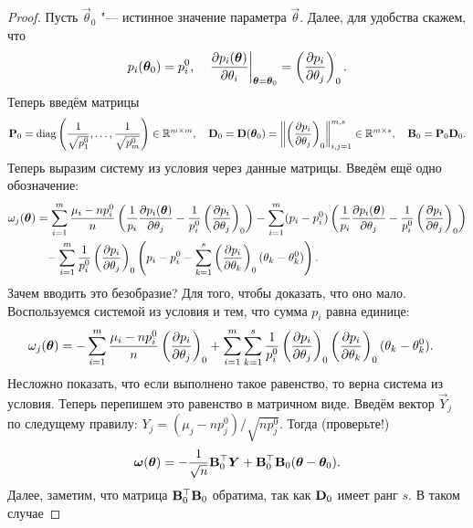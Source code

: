 \begin{proof}
	Пусть $\vec{\theta}_{0}$ "--- истинное значение параметра $\vec{\theta}$. Далее, для удобства скажем, что
	\[
		p_{i}(\bm{\theta}_{0}) = p_{i}^{0}, 
		\quad
		\left.\pdv{p_{i}(\bm{\theta})}{\theta_{i}}\right|_{\bm{\theta} = \bm{\theta}_{0}}
		= \left(\pdv{p_{i}}{\theta_{j}}\right)_{0}.
	\]
	Теперь введём матрицы
	\[
		\mathbf{P}_{0}
		= \operatorname{diag}\left(\frac{1}{\sqrt{p_{1}^{0}}}, \ldots, \frac{1}{\sqrt{p_{m}^{0}}}\right) \in \mathbb{R}^{m \times m},
		\quad
		\mathbf{D}_{0}
		= \mathbf{D}(\bm{\theta}_{0})
		= \left\|\left(\pdv{p_{i}}{\theta_{j}}\right)_{0}\right\|_{i, j = 1}^{m, s} \in \mathbb{R}^{m \times s},
		\quad 
		\mathbf{B}_{0}
		= \mathbf{P}_{0}\mathbf{D}_{0}.
	\]
	Теперь выразим систему из условия через данные матрицы. Введём ещё одно обозначение:
	\begin{align*}
		\omega_{j}(\bm{\theta})
		&= \sum_{i = 1}^{m} \frac{\mu_{i} - np_{i}^{0}}{n}\left(\frac{1}{p_{i}}\pdv{p_{i}(\bm{\theta})}{\theta_{j}} - \frac{1}{p_{i}^{0}}\left(\pdv{p_{i}}{\theta_{j}}\right)_{0}\right)
		- \sum_{i = 1}^{m} (p_{i} - p_{i}^{0})\left(\frac{1}{p_{i}}\pdv{p_{i}(\bm{\theta})}{\theta_{j}} - \frac{1}{p_{i}^{0}}\left(\pdv{p_{i}}{\theta_{j}}\right)_{0}\right) \\
		&\hphantom{=}- \sum_{i = 1}^{m} \frac{1}{p_{i}^{0}}\left(\pdv{p_{i}}{\theta_{j}}\right)_{0}\left(p_{i} - p_{i}^{0} - \sum_{k = 1}^{s}\left(\pdv{p_{i}}{\theta_{k}}\right)_{0}(\theta_{k} - \theta_{k}^{0})\right).
	\end{align*}
	Зачем вводить это безобразие? Для того, чтобы доказать, что оно мало. Воспользуемся системой из условия и тем, что сумма $p_{i}$ равна единице:
	\begin{align*}
		\omega_{j}(\bm{\theta})
		&= -\sum_{i = 1}^{m} \frac{\mu_{i} - np_{i}^{0}}{n}\left(\pdv{p_{i}}{\theta_{j}}\right)_{0} + \sum_{i = 1}^{m} \sum_{k = 1}^{s} \frac{1}{p_{i}^{0}}\left(\pdv{p_{i}}{\theta_{j}}\right)_{0}\left(\pdv{p_{i}}{\theta_{k}}\right)_{0}(\theta_{k} - \theta_{k}^{0}).
	\end{align*}
	Несложно показать, что если выполнено такое равенство, то верна система из условия. Теперь перепишем это равенство в матричном виде. Введём вектор $\vec{Y}_{j}$ по следущему правилу: $Y_{j} = (\mu_{j} - np_{j}^{0})/\sqrt{np_{j}^{0}}$. Тогда (проверьте!)
	\[
		\bm{\omega}(\bm{\theta})
		= -\frac{1}{\sqrt{n}}\mathbf{B}_{0}^{\top}\bm{Y} + \mathbf{B}_{0}^{\top}\mathbf{B}_{0}(\bm{\theta} - \bm{\theta}_{0}).
	\]
	Далее, заметим, что матрица $\mathbf{B}_{0}^{\top}\mathbf{B}_{0}$ обратима, так как $\mathbf{D}_{0}$ имеет ранг $s$. В таком случае

\end{proof}
